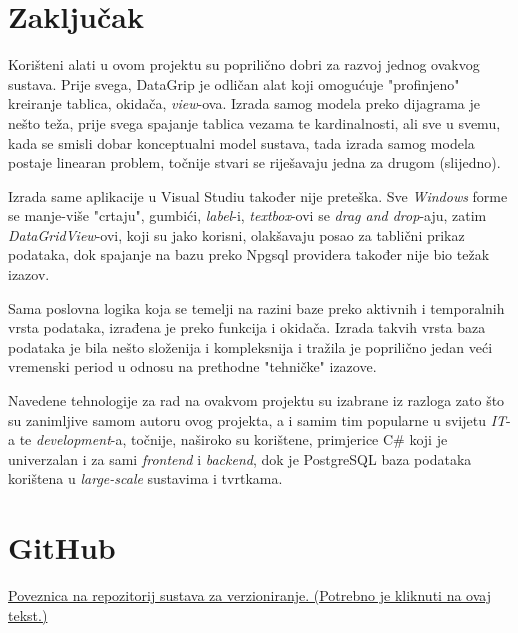 \documentclass[]{foi}
\begin{document}
\chapter{Zaključak}

Korišteni alati u ovom projektu su poprilično dobri za razvoj jednog ovakvog sustava. Prije svega, DataGrip je odličan alat koji omogućuje "profinjeno" kreiranje tablica, okidača, \textit{view}-ova. Izrada samog modela preko dijagrama je nešto teža, prije svega spajanje tablica vezama te kardinalnosti, ali sve u svemu, kada se smisli dobar konceptualni model sustava, tada izrada samog modela postaje linearan problem, točnije stvari se riješavaju jedna za drugom (slijedno).

Izrada same aplikacije u Visual Studiu također nije preteška. Sve \textit{Windows} forme se manje-više "crtaju", gumbići, \textit{label}-i, \textit{textbox}-ovi se \textit{drag and drop}-aju, zatim \textit{DataGridView}-ovi, koji su jako korisni, olakšavaju posao za tablični prikaz podataka, dok spajanje na bazu preko Npgsql providera također nije bio težak izazov.

Sama poslovna logika koja se temelji na razini baze preko aktivnih i temporalnih vrsta podataka, izrađena je preko funkcija i okidača. Izrada takvih vrsta baza podataka je bila nešto složenija i kompleksnija i tražila je poprilično jedan veći vremenski period u odnosu na prethodne "tehničke" izazove.

Navedene tehnologije za rad na ovakvom projektu su izabrane iz razloga zato što su zanimljive samom autoru ovog projekta, a i samim tim popularne u svijetu \textit{IT}-a te \textit{development}-a, točnije, naširoko su korištene, primjerice C\# koji je univerzalan i za sami \textit{frontend} i \textit{backend}, dok je PostgreSQL baza podataka korištena u \textit{large-scale} sustavima i tvrtkama.

\makebackmatter

\appendices %

\chapter{GitHub} %

\href{https://github.com/pmatisic/rentacar}{Poveznica na repozitorij sustava za verzioniranje. (Potrebno je kliknuti na ovaj tekst.)}
\end{document}
